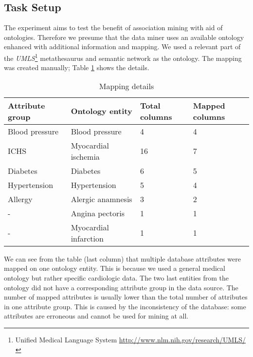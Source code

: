 \subsection{Task Setup}\label{Task}
The experiment aims to test the benefit of association mining with aid of ontologies. 
Therefore we presume that the data miner uses an available ontology enhanced with additional information and mapping. 
We used a relevant part of the \emph{UMLS}\footnote{Unified Medical Language System \url{http://www.nlm.nih.gov/research/UMLS/}} metathesaurus and semantic network as the ontology. 
The mapping was created manually; Table \ref{tab:Mapping} shows the details.

\begin{table}[ht]
	\centering
		\begin{tabular}{|p{}|p{}|p{}|p{}|}
			\hline
			\textbf{Attribute group} & \textbf{Ontology entity} & \textbf{Total columns} & \textbf{Mapped columns}\\
			\hline
			Blood pressure & Blood pressure & 4 & 4 \\
			\hline
			ICHS & Myocardial ischemia & 16 & 7 \\
			\hline
			Diabetes & Diabetes & 6 & 5 \\
			\hline
			Hypertension & Hypertension & 5 & 4 \\
			\hline
			Allergy & Alergic anamnesis & 3 & 2 \\
			\hline
			 - & Angina pectoris & 1 & 1 \\
			\hline
			 - & Myocardial infarction & 1 & 1 \\
			 \hline
		\end{tabular}
	\caption{Mapping details}
	\label{tab:Mapping}
\end{table}

We can see from the table (last column) that multiple database attributes were mapped on one ontology entity. 
This is because we used a general medical ontology but rather specific cardiologic data. 
The two last entities from the ontology did not have a corresponding attribute group in the data source. 
The number of mapped attributes is usually lower than the total number of attributes in one attribute group. 
This is caused by the inconsistency of the database: some attributes are erroneous and cannot be used for mining at all. 

